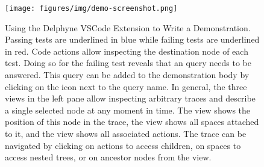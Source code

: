 \begin{figure}
\centering
\texttt{[image: figures/img/demo-screenshot.png]}
\vspace{-1cm}
\caption{Using the Delphyne VSCode Extension to Write a Demonstration. Passing tests are underlined in blue while failing tests are underlined in red. Code actions allow inspecting the destination node of each test. Doing so for the failing test reveals that an  query needs to be answered. This query can be added to the demonstration body by clicking on the \code{+} icon next to the query name. In general, the three views in the left pane allow inspecting arbitrary traces and describe a single selected node at any  moment in time. The  view shows the position of this node in the trace, the  view shows all spaces attached to it, and the  view shows all associated actions. The trace can be navigated by clicking on actions to access children, on spaces to access nested trees, or on ancestor nodes from the  view. }\label{fig:demo-screenshot}
\end{figure}
